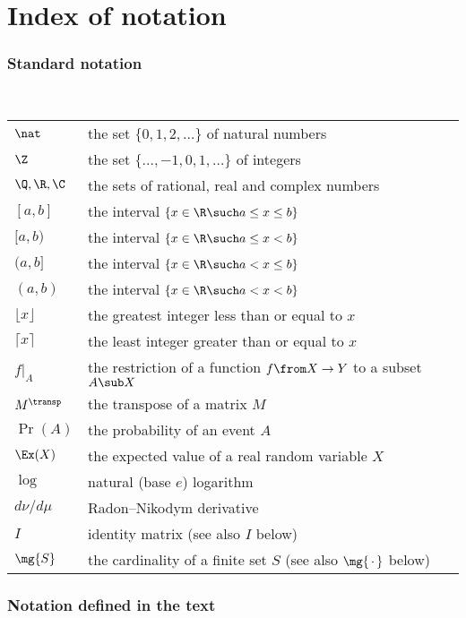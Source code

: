 \chapter*{Index of notation}
\smallish

\subsection*{Standard notation}

\setlength{\parindent}{0em}%
\ \\
\begin{tabular}{ll}
$\nat$& the set $\{0, 1, 2, \ldots\}$ of natural numbers\\
$\Z$& the set $\{ \ldots, -1, 0, 1, \ldots \}$ of integers\\
$\Q, \R, \C$& the sets of rational, real and complex numbers\\
$[a, b]$& the interval $\{ x \in \R \such a \leq x \leq b \}$\\
$[a, b)$& the interval $\{ x \in \R \such a \leq x < b \}$\\
$(a, b]$& the interval $\{ x \in \R \such a < x \leq b \}$\\
$(a, b)$& the interval $\{ x \in \R \such a < x < b \}$\\
$\lfloor x \rfloor$& the greatest integer less than or equal to $x$\\
$\lceil x \rceil$& the least integer greater than or equal to $x$\\
$f|_A$& the restriction of a function $f \from X \to Y$ to a subset $A \sub X$\\
$M^\transp$& the transpose of a matrix $M$\\
$\Pr(A)$& the probability of an event $A$\\
$\Ex(X)$& the expected value of a real random variable $X$\\
$\log$& natural (base $e$) logarithm\\
$d\nu/d\mu$& Radon--Nikodym derivative\\
$I$& identity matrix (see also $I$ below)\\
$\mg{S}$& the cardinality of a finite set $S$ (see also $\mg{\,\cdot\,}$ below)
\end{tabular}


\subsection*{Notation defined in the text}

